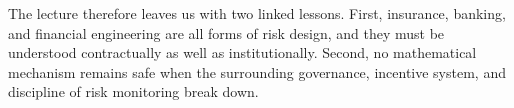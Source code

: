 The lecture therefore leaves us with two linked lessons. First, insurance, banking, and financial engineering are all forms of risk design, and they must be understood contractually as well as institutionally. Second, no mathematical mechanism remains safe when the surrounding governance, incentive system, and discipline of risk monitoring break down.